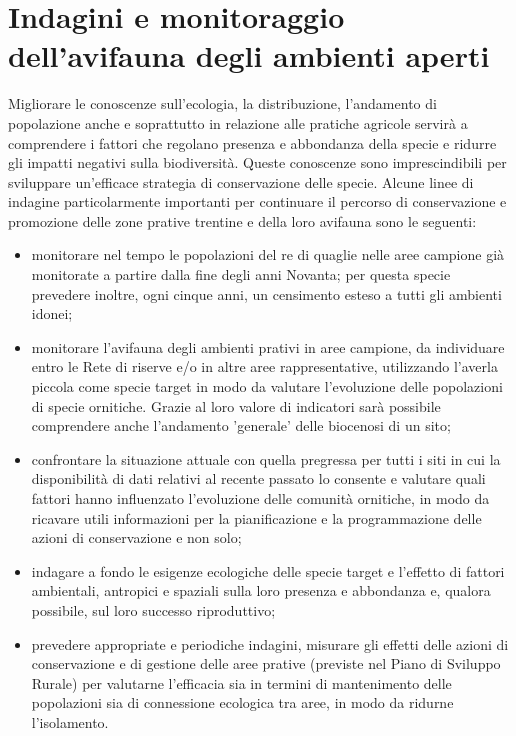\documentclass[10pt,twoside,openany,x11names,svgnames,italian,a5paper,dvipsnames,table]{memoir}
\begin{document}
\section{Indagini e monitoraggio dell'avifauna degli ambienti aperti}
Migliorare le conoscenze sull’ecologia, la distribuzione, l’andamento di popolazione anche e soprattutto in relazione alle pratiche agricole servirà a comprendere i fattori che regolano presenza e abbondanza della specie e ridurre gli impatti negativi sulla biodiversità. Queste conoscenze sono imprescindibili per sviluppare un’efficace strategia di conservazione delle specie.
Alcune linee di indagine particolarmente importanti per continuare il percorso di conservazione e promozione delle zone prative trentine e della loro avifauna sono le seguenti:
\begin{itemize}\itemsep0pt
  \item monitorare nel tempo le popolazioni del re di quaglie nelle aree campione già monitorate a partire dalla fine degli anni Novanta; per questa specie prevedere inoltre, ogni cinque anni, un censimento esteso a tutti gli ambienti idonei;
  \item monitorare l’avifauna degli ambienti prativi in aree campione, da individuare entro le Rete di riserve e/o in altre aree rappresentative, utilizzando l’averla piccola come specie target in modo da valutare l'evoluzione delle popolazioni di specie ornitiche. Grazie al loro valore di indicatori sarà possibile comprendere anche l'andamento 'generale' delle biocenosi di un sito;
  \item confrontare la situazione attuale con quella pregressa per tutti i siti in cui la disponibilità di dati relativi al recente passato lo consente e valutare quali fattori hanno influenzato l'evoluzione delle comunità ornitiche, in modo da ricavare utili informazioni per la pianificazione e la programmazione delle azioni di conservazione e non solo;
  \item indagare a fondo le esigenze ecologiche delle specie target e l'effetto di fattori ambientali, antropici e spaziali sulla loro presenza e abbondanza e, qualora possibile, sul loro successo riproduttivo;
  \item prevedere appropriate e periodiche indagini, misurare gli effetti delle azioni di conservazione e di gestione delle aree prative (previste nel Piano di Sviluppo Rurale) per valutarne l’efficacia sia in termini di mantenimento delle popolazioni sia di connessione ecologica tra aree, in modo da ridurne l'isolamento.
\end{itemize}
\end{document}

